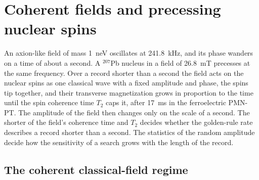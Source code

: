 \section{Coherent fields and precessing nuclear spins}\label{sec:14.6}

An axion-like field of mass \SI{1}{neV} oscillates at \SI{241.8}{kHz}, and its phase wanders on a time of about a second. A $^{207}$Pb nucleus in a field of \SI{26.8}{mT} precesses at the same frequency. Over a record shorter than a second the field acts on the nuclear spins as one classical wave with a fixed amplitude and phase, the spins tip together, and their transverse magnetization grows in proportion to the time until the spin coherence time $T_2$ caps it, after \SI{17}{ms} in the ferroelectric PMN-PT. The amplitude of the field then changes only on the scale of a second. The shorter of the field's coherence time and $T_2$ decides whether the golden-rule rate describes a record shorter than a second. The statistics of the random amplitude decide how the sensitivity of a search grows with the length of the record.

\subsection{The coherent classical-field regime}\label{sec:14.6-regime}

